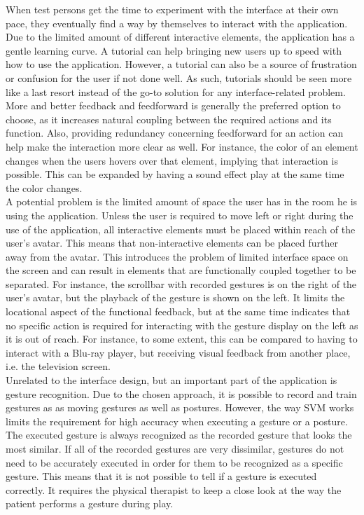 When test persons get the time to experiment with the interface at their own pace, they eventually find a way by themselves to interact with the application. Due to the limited amount of different interactive elements, the application has a gentle learning curve. A tutorial can help bringing new users up to speed with how to use the application. However, a tutorial can also be a source of frustration or confusion for the user if not done well. As such, tutorials should be seen more like a last resort instead of the go-to solution for any interface-related problem. More and better feedback and feedforward is generally the preferred option to choose, as it increases natural coupling between the required actions and its function. Also, providing redundancy concerning feedforward for an action can help make the interaction more clear as well. For instance, the color of an element changes when the users hovers over that element, implying that interaction is possible. This can be expanded by having a sound effect play at the same time the color changes.\\

A potential problem is the limited amount of space the user has in the room he is using the application. Unless the user is required to move left or right during the use of the application, all interactive elements must be placed within reach of the user's avatar. This means that non-interactive elements can be placed further away from the avatar. This introduces the problem of limited interface space on the screen and can result in elements that are functionally coupled together to be separated. For instance, the scrollbar with recorded gestures is on the right of the user's avatar, but the playback of the gesture is shown on the left. It limits the locational aspect of the functional feedback, but at the same time indicates that no specific action is required for interacting with the gesture display on the left as it is out of reach. For instance, to some extent, this can be compared to having to interact with a Blu-ray player, but receiving visual feedback from another place, i.e. the television screen.\\

Unrelated to the interface design, but an important part of the application is gesture recognition. Due to the chosen approach, it is possible to record and train gestures as as  moving gestures as well as postures. However, the way SVM works limits the requirement for high accuracy when executing a gesture or a posture. The executed gesture is always recognized as the recorded gesture that looks the most similar. If all of the recorded gestures are very dissimilar, gestures do not need to be accurately executed in order for them to be recognized as a specific gesture. This means that it is not possible to tell if a gesture is executed correctly. It requires the physical therapist to keep a close look at the way the patient performs a gesture during play.\\

